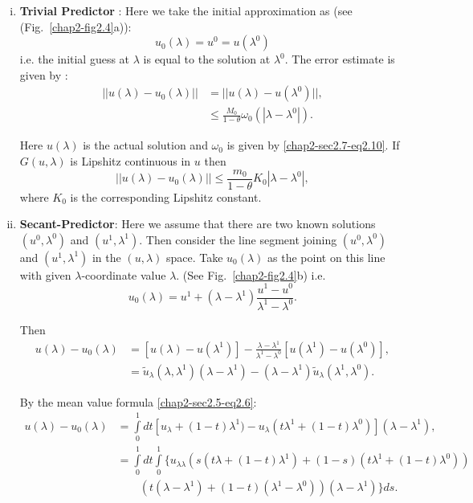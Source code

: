 \begin{enumerate}[(i)]
\item {\bf Trivial Predictor} : Here we take the initial approximation
  as (see (Fig.~\ref{chap2-fig2.4}a)): 
$$
u_0 (\lambda) = u^0 = u (\lambda^0) 
$$   
i.e. the initial guess at $\lambda$ is equal to the solution at
$\lambda^0$. The error estimate is given by : 
\begin{align*}
|| u(\lambda ) - u_0 (\lambda ) || &= || u(\lambda ) - u(\lambda^0 )
||, \\ 
&\leq \frac{M_0}{1-\theta} \omega_0 (| \lambda - \lambda^0 |). 
\end{align*} 

Here $u(\lambda)$ is the actual solution and $\omega_0$ is given by
\eqref{chap2-sec2.7-eq2.10}. If $G(u, \lambda)$ is Lipshitz continuous
in $u$ then   
$$
|| u(\lambda ) - u_0 (\lambda) || \leq \frac{m_0}{1-\theta} K_0 |
\lambda - \lambda^0 |, 
$$ 
where $K_0$ is the corresponding Lipshitz constant. 

\item {\bf Secant-Predictor}: Here we assume that there are two known
  solutions $(u^0, \lambda^0)$ and $(u^1,\lambda^1)$. Then consider
  the line  segment joining $(u^0, \lambda^0)$ and $(u^1,\lambda^1)$
  in the $(u, \lambda)$ space. Take $u_0 (\lambda)$ as the point on
  this line with given $\lambda$-coordinate value $\lambda$. (See
  Fig.~\ref{chap2-fig2.4}b) i.e. 
$$
u_0 (\lambda ) = u^1 + (\lambda - \lambda^1) \frac{u^1 -
u^0}{\lambda^1 - \lambda^0}. 
$$

Then\pageoriginale 
\begin{align*}
u(\lambda ) - u_0(\lambda) & = [u(\lambda ) - u (\lambda^1 )] - \frac{\lambda -
  \lambda^1}{\lambda^1 - \lambda^0} [u(\lambda^1 ) - u (\lambda^0 )], 
\\ 
& = \tilde{u}_{\lambda}(\lambda ,\lambda^1 )  (\lambda - \lambda^1 ) -
(\lambda - \lambda^1 ) \tilde{u}_\lambda (\lambda^1 , \lambda^0 ). 
\end{align*}

By the mean value formula \eqref{chap2-sec2.5-eq2.6}: 
{\fontsize{10pt}{12pt}\selectfont
\begin{align*}
u(\lambda ) - u_0 (\lambda ) &= \int\limits_0^1  dt[u_\lambda
  + (1-t)\lambda^1 ) - u_\lambda (t \lambda^1 + (1-t)\lambda^0 )]
(\lambda - \lambda^1 ),\\ 
&= \int \limits_0^1  dt \int\limits_0^1 \{ u_{\lambda
  \lambda}  (s (t \lambda + (1-t)\lambda^1)  + (1-s)(t \lambda^1 + (1-t)
\lambda^0 ))\\
& \qquad (t(\lambda - \lambda^1 ) + (1-t)(\lambda^1 - \lambda^0 ))
(\lambda - \lambda^1 )\} ds. 
\end{align*}}\relax


\end{enumerate}

